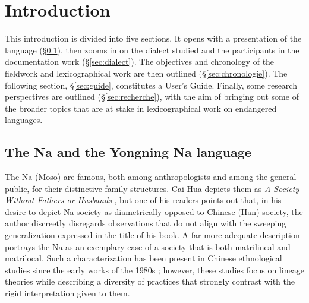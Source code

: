 \langueeng

\chapter*{Introduction}

This introduction is divided into five sections. It opens with a presentation of the language (§\ref{sec:lang}), then zooms in on the dialect studied and the participants in the documentation work (§\ref{sec:dialect}). The objectives and chronology of the fieldwork and lexicographical work are then outlined (§\ref{sec:chronologie}). The following section, §\ref{sec:guide}, constitutes a User's Guide. Finally, some research perspectives are outlined (§\ref{sec:recherche}), with the aim of bringing out some of the broader topics that are at stake in lexicographical work on endangered languages.

\section{The Na and the Yongning Na language}
\label{sec:lang}

The Na (Moso) are famous, both among anthropologists and among the general public, for their distinctive family structures. Cai Hua depicts them as \emph{A Society Without Fathers or Husbands} \parencite{cai1997}, but one of his readers \parencite[147]{wellens2003} points out that, in his desire to depict Na society as diametrically opposed to Chinese (Han) society, the author discreetly disregards observations that do not align with the sweeping generalization expressed in the title of his book. A far more adequate description portrays the Na as an exemplary case of a society that is both matrilineal and matrilocal. Such a characterization has been present in Chinese ethnological studies since the early works of the 1980s \parencite{zhanetal1980,zhanyanetal1983,weng1993,shih1993,shih2010}; however, these studies focus on lineage theories while describing a diversity of practices that strongly contrast with the rigid interpretation given to them.

